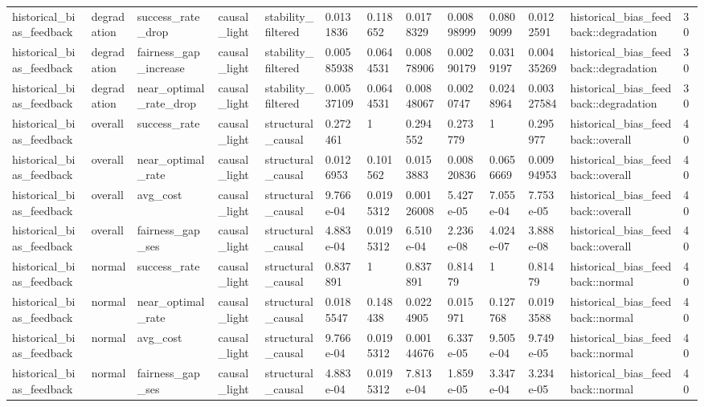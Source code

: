 \begin{tabular}{lllllllllllll}
historical\_bias\_feedback & degradation & success\_rate\_drop & causal\_light & stability\_filtered & 0.0131836 & 0.118652 & 0.0178329 & 0.00898999 & 0.0809099 & 0.0122591 & historical\_bias\_feedback::degradation & 30 \\
historical\_bias\_feedback & degradation & fairness\_gap\_increase & causal\_light & stability\_filtered & 0.00585938 & 0.0644531 & 0.00878906 & 0.00290179 & 0.0319197 & 0.00435269 & historical\_bias\_feedback::degradation & 30 \\
historical\_bias\_feedback & degradation & near\_optimal\_rate\_drop & causal\_light & stability\_filtered & 0.00537109 & 0.0644531 & 0.00848067 & 0.0020747 & 0.0248964 & 0.00327584 & historical\_bias\_feedback::degradation & 30 \\
historical\_bias\_feedback & overall & success\_rate & causal\_light & structural\_causal & 0.272461 & 1 & 0.294552 & 0.273779 & 1 & 0.295977 & historical\_bias\_feedback::overall & 40 \\
historical\_bias\_feedback & overall & near\_optimal\_rate & causal\_light & structural\_causal & 0.0126953 & 0.101562 & 0.0153883 & 0.00820836 & 0.0656669 & 0.00994953 & historical\_bias\_feedback::overall & 40 \\
historical\_bias\_feedback & overall & avg\_cost & causal\_light & structural\_causal & 9.766e-04 & 0.0195312 & 0.00126008 & 5.427e-05 & 7.055e-04 & 7.753e-05 & historical\_bias\_feedback::overall & 40 \\
historical\_bias\_feedback & overall & fairness\_gap\_ses & causal\_light & structural\_causal & 4.883e-04 & 0.0195312 & 6.510e-04 & 2.236e-08 & 4.024e-07 & 3.888e-08 & historical\_bias\_feedback::overall & 40 \\
historical\_bias\_feedback & normal & success\_rate & causal\_light & structural\_causal & 0.837891 & 1 & 0.837891 & 0.81479 & 1 & 0.81479 & historical\_bias\_feedback::normal & 40 \\
historical\_bias\_feedback & normal & near\_optimal\_rate & causal\_light & structural\_causal & 0.0185547 & 0.148438 & 0.0224905 & 0.015971 & 0.127768 & 0.0193588 & historical\_bias\_feedback::normal & 40 \\
historical\_bias\_feedback & normal & avg\_cost & causal\_light & structural\_causal & 9.766e-04 & 0.0195312 & 0.00144676 & 6.337e-05 & 9.505e-04 & 9.749e-05 & historical\_bias\_feedback::normal & 40 \\
historical\_bias\_feedback & normal & fairness\_gap\_ses & causal\_light & structural\_causal & 4.883e-04 & 0.0195312 & 7.813e-04 & 1.859e-05 & 3.347e-04 & 3.234e-05 & historical\_bias\_feedback::normal & 40 \\

\end{tabular}
